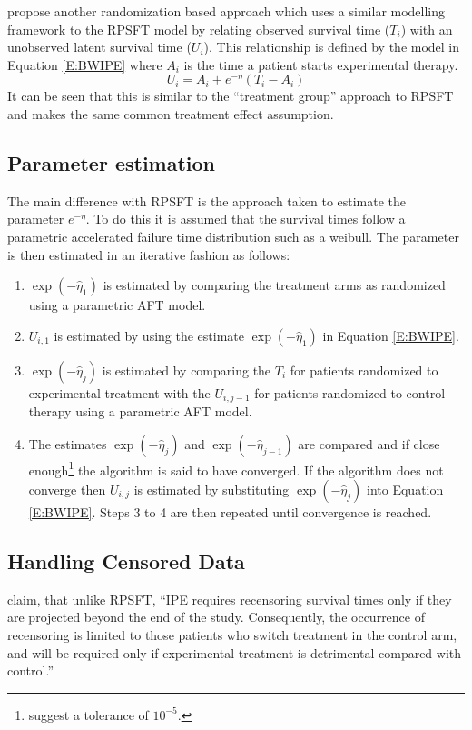 \cite{Branson2002} propose another randomization based approach which uses a similar modelling framework to the RPSFT model by relating observed survival time ($T_i$) with an unobserved latent survival time ($U_i$). This relationship is defined by the model in Equation \ref{E:BWIPE} where $A_i$ is the time a patient starts experimental therapy.
\begin{equation}
U_{i} = A_i + e^{-\eta}( T_{i} - A_i )
\label{E:BWIPE}
\end{equation}
It can be seen that this is similar to the ``treatment group'' approach to RPSFT and makes the same common treatment effect assumption. 

\subsection{Parameter estimation}
The main difference with RPSFT is the approach taken to estimate the parameter $e^{-\eta}$. To do this it is assumed that the survival times follow a parametric accelerated failure time distribution such as a weibull. The parameter is then estimated in an iterative fashion as follows:
\begin{enumerate}
\item $\exp(-\hat{\eta}_1)$ is estimated by comparing the treatment arms as randomized using a parametric AFT model.
\item $U_{i,1}$ is estimated by using the estimate $\exp(-\hat{\eta}_1)$  in Equation  \ref{E:BWIPE}. \label{step1}
\item $\exp(-\hat{\eta}_j)$  is estimated by comparing the $T_i$ for patients randomized to experimental treatment with the $U_{i,j-1}$ for patients randomized to control therapy using a parametric AFT model. 
\item The estimates $\exp(-\hat{\eta}_j)$ and $\exp(-\hat{\eta}_{j-1})$  are compared and if close enough\footnote{\cite{Branson2002} suggest a tolerance of $10^{-5}$.} the algorithm is said to have converged. If the algorithm does not converge then $U_{i,j}$ is estimated by substituting $\exp(-\hat{\eta}_j)$ into Equation \ref{E:BWIPE}. Steps 3 to 4 are then repeated until convergence is reached.
\end{enumerate}

\subsection{Handling Censored Data}
\label{S:chap_methrev:MIPE}

\cite{Branson2002} claim, that unlike RPSFT, ``IPE requires recensoring survival times only if they are projected beyond the end of the study. Consequently, the occurrence of recensoring is limited to those patients who switch treatment in the control arm, and will be required only if experimental treatment is detrimental compared with control.''

